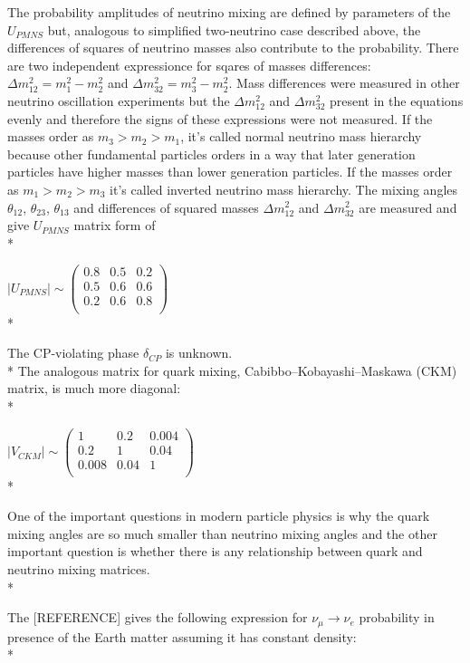 The probability amplitudes of neutrino mixing are defined by parameters of the $U_{PMNS}$ but, analogous to simplified two-neutrino case described above, the differences of squares of neutrino masses also contribute to the probability. There are two independent expressionce for sqares of masses differences: ${\Delta}m_{12}^2 = m_1^2-m_2^2$ and ${\Delta}m_{32}^2 = m_3^2-m_2^2$. Mass differences were measured in other neutrino oscillation experiments but the ${\Delta}m_{12}^2$ and ${\Delta}m_{32}^2$ present in the equations evenly and therefore the signs of these expressions were not measured. If the masses order as $m_3 > m_2 > m_1$, it's called normal neutrino mass hierarchy because other fundamental particles orders in a way that later generation particles have higher masses than lower generation particles. If the masses order as $m_1 > m_2 > m_3$ it's called inverted neutrino mass hierarchy. The mixing angles $\theta_{12}$, $\theta_{23}$, $\theta_{13}$ and differences of squared masses ${\Delta}m_{12}^2$ and ${\Delta}m_{32}^2$ are measured and give $U_{PMNS}$ matrix form of\\*

$|U_{PMNS}| \sim
 \begin{pmatrix}
  0.8 & 0.5 & 0.2 \\ 0.5 & 0.6 & 0.6 \\ 0.2 & 0.6 & 0.8 \\
 \end{pmatrix}$\\*

The CP-violating phase $\delta_{CP}$ is unknown.\\*
The analogous matrix for quark mixing, Cabibbo–Kobayashi–Maskawa (CKM) matrix, is much more diagonal:\\*

$|V_{CKM}| \sim
 \begin{pmatrix}
  1 & 0.2 & 0.004 \\ 0.2 & 1 & 0.04 \\ 0.008 & 0.04 & 1 \\
 \end{pmatrix}$\\*

One of the important questions in modern particle physics is why the quark mixing angles are so much smaller than neutrino mixing angles and the other important question is whether there is any relationship between quark and neutrino mixing matrices.\\*

The [REFERENCE] gives the following expression for $\nu_\mu \rightarrow \nu_e$ probability in presence of the Earth matter assuming it has constant density: \\*

